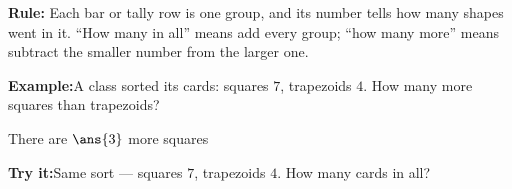 \documentclass[12pt]{article}
\begin{document}
\begin{formulabox}
\textbf{Rule:} Each bar or tally row is one group, and its number tells how
many shapes went in it. ``How many in all'' means add every group; ``how many
more'' means subtract the smaller number from the larger one.
\end{formulabox}
\begin{examplebox}
\textbf{Example:}\quad A class sorted its cards: squares $7$, trapezoids $4$.
How many more squares than trapezoids?

There are $\ans{3}$ more squares
\end{examplebox}
\begin{tryitbox}
\textbf{Try it:}\quad Same sort --- squares $7$, trapezoids $4$. How many cards
in all?\quad
{}
\end{tryitbox}
\end{document}
